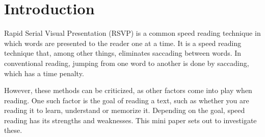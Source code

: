 \section{Introduction}
Rapid Serial Visual Presentation (RSVP) is a common speed reading technique in which words are presented to the reader one at a time. It is a speed reading technique that, among other things, eliminates saccading between words. In conventional reading, jumping from one word to another is done by saccading, which has a time penalty.

However, these methods can be criticized, as other factors come into play when reading. One such factor is the goal of reading a text, such as whether you are reading it to learn, understand or memorize it. Depending on the goal, speed reading has its strengths and weaknesses. This mini paper sets out to investigate these.